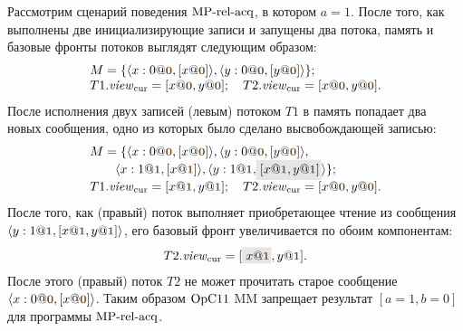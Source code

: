 Рассмотрим сценарий поведения ${\rm MP\text{-}rel\text{-}acq}$, в котором $a = 1$.
После того, как выполнены две инициализирующие записи и запущены два потока, память и базовые фронты потоков
выглядят следующим образом:
\[
\begin{array}{l}
M = \{\angled{x:0@\tstamp{0}, [x@\tstamp{0}]}, \angled{y:0@\tstamp{0},[y@\tstamp{0}]} \}; \\
T1.\Rcur = [x@\tstamp{0}, y@\tstamp{0}];
\quad T2.\Rcur = [x@\tstamp{0}, y@\tstamp{0}].
\end{array}
\]
После исполнения двух записей (левым) потоком $T1$ в память попадает два новых сообщения, одно из которых
было сделано высвобождающей записью:
\[
\begin{array}{l}
M = \{
\angled{x:0@\tstamp{0}, [x@\tstamp{0}]}, \angled{y:0@\tstamp{0},[y@\tstamp{0}]}, \\
\qquad \angled{x:1@\tstamp{1}, [x@\tstamp{1}]}, \angled{y:1@\tstamp{1},\graybox{[x@\tstamp{1},y@\tstamp{1}]}}
 \}; \\
T1.\Rcur = [x@\tstamp{1}, y@\tstamp{1}];
\quad T2.\Rcur = [x@\tstamp{0}, y@\tstamp{0}].
\end{array}
\]
После того, как (правый) поток выполняет приобретающее чтение из сообщения 
$\angled{y:1@\tstamp{1},[x@\tstamp{1},y@\tstamp{1}]}$, его базовый фронт увеличивается по обоим компонентам:
\[
\begin{array}{l}
T2.\Rcur = [\graybox{x@\tstamp{1}}, y@\tstamp{1}].
\end{array}
\]
После этого (правый) поток $T2$ не может прочитать старое сообщение $\angled{x:0@\tstamp{0}, [x@\tstamp{0}]}$.
Таким образом $\mathrm{OpC11}$ MM запрещает результат $[a = 1, b = 0]$ для программы ${\rm MP\text{-}rel\text{-}acq}$.

